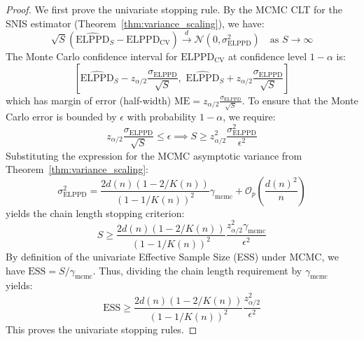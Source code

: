 \documentclass[12pt]{article}
\begin{document}
\begin{proof}
We first prove the univariate stopping rule. By the MCMC CLT for the SNIS estimator (Theorem~\ref{thm:variance_scaling}), we have:
\[
\sqrt{S}\left( \widehat{\text{ELPPD}}_S - \text{ELPPD}_{\text{CV}} \right) \xrightarrow{d} \mathcal{N}\left( 0, \sigma^2_{\mathrm{ELPPD}} \right) \quad \text{as } S \to \infty
\]
The Monte Carlo confidence interval for $\text{ELPPD}_{\text{CV}}$ at confidence level $1 - \alpha$ is:
\[
\left[ \widehat{\text{ELPPD}}_S - z_{\alpha/2} \frac{\sigma_{\mathrm{ELPPD}}}{\sqrt{S}}, \,\, \widehat{\text{ELPPD}}_S + z_{\alpha/2} \frac{\sigma_{\mathrm{ELPPD}}}{\sqrt{S}} \right]
\]
which has margin of error (half-width) $\text{ME} = z_{\alpha/2} \frac{\sigma_{\mathrm{ELPPD}}}{\sqrt{S}}$. To ensure that the Monte Carlo error is bounded by $\epsilon$ with probability $1 - \alpha$, we require:
\[
z_{\alpha/2} \frac{\sigma_{\mathrm{ELPPD}}}{\sqrt{S}} \leq \epsilon \implies S \geq z_{\alpha/2}^2 \frac{\sigma^2_{\mathrm{ELPPD}}}{\epsilon^2}
\]
Substituting the expression for the MCMC asymptotic variance from Theorem~\ref{thm:variance_scaling}:
\[
\sigma^2_{\mathrm{ELPPD}} = \frac{2 d(n) (1 - 2/K(n))}{(1 - 1/K(n))^2} \gamma_{\mathrm{mcmc}} + \mathcal{O}_p\left( \frac{d(n)^2}{n} \right)
\]
yields the chain length stopping criterion:
\[
S \geq \frac{2 d(n) (1 - 2/K(n))}{(1 - 1/K(n))^2} \frac{z_{\alpha/2}^2 \gamma_{\mathrm{mcmc}}}{\epsilon^2}
\]
By definition of the univariate Effective Sample Size (ESS) under MCMC, we have $\text{ESS} = S / \gamma_{\mathrm{mcmc}}$. Thus, dividing the chain length requirement by $\gamma_{\mathrm{mcmc}}$ yields:
\[
\text{ESS} \geq \frac{2 d(n) (1 - 2/K(n))}{(1 - 1/K(n))^2} \frac{z_{\alpha/2}^2}{\epsilon^2}
\]
This proves the univariate stopping rules.


\end{proof}
\end{document}

